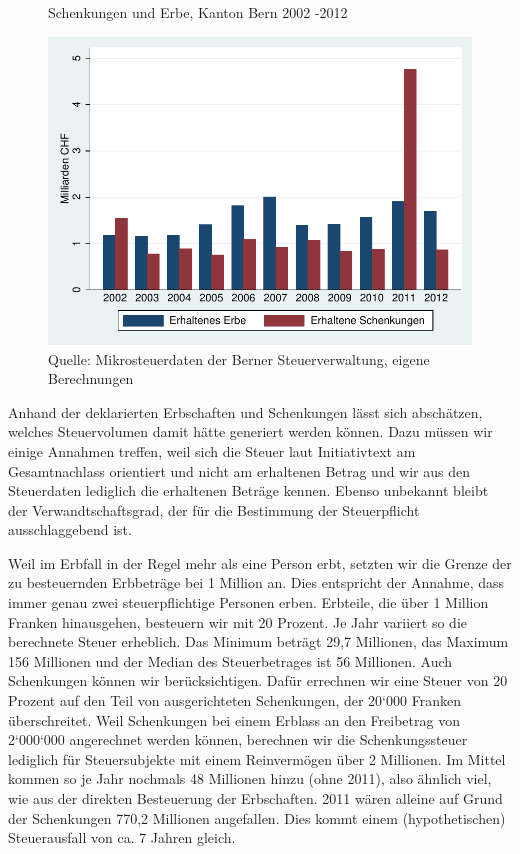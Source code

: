 \documentclass[a4paper, 12pt,liststotoc]{scrartcl}
\numberwithin{equation}{section}
\begin{document}
\begin{figure}[!ht]
  \caption{Schenkungen und Erbe, Kanton Bern 2002 -2012}
  \label{fig:schenkungen_und_erbe}
  \centering
    \includegraphics[width=\textwidth]{figure/ErbeSchenkungen}
  \caption*{Quelle: Mikrosteuerdaten der Berner Steuerverwaltung, eigene Berechnungen}
\end{figure}

Anhand der deklarierten Erbschaften und Schenkungen lässt sich
abschätzen, welches Steuervolumen damit hätte generiert werden können.
Dazu müssen wir einige Annahmen treffen, weil sich die Steuer laut
Initiativtext am Gesamtnachlass orientiert und nicht am erhaltenen
Betrag und wir aus den Steuerdaten lediglich die erhaltenen Beträge
kennen. Ebenso unbekannt bleibt der Verwandtschaftsgrad, der für die
Bestimmung der Steuerpflicht ausschlaggebend ist.

Weil im Erbfall in der Regel mehr als eine Person erbt, setzten wir die
Grenze der zu besteuernden Erbbeträge bei 1 Million an. Dies entspricht
der Annahme, dass immer genau zwei steuerpflichtige Personen erben.
Erbteile, die über 1 Million Franken hinausgehen, besteuern wir mit 20
Prozent. Je Jahr variiert so die berechnete Steuer erheblich. Das
Minimum beträgt 29,7 Millionen, das Maximum 156 Millionen und der Median
des Steuerbetrages ist 56 Millionen. Auch Schenkungen können wir
berücksichtigen. Dafür errechnen wir eine Steuer von 20 Prozent auf den
Teil von ausgerichteten Schenkungen, der 20`000 Franken überschreitet.
Weil Schenkungen bei einem Erblass an den Freibetrag von 2`000`000
angerechnet werden können, berechnen wir die Schenkungssteuer lediglich
für Steuersubjekte mit einem Reinvermögen über 2 Millionen. Im Mittel
kommen so je Jahr nochmals 48 Millionen hinzu (ohne 2011), also ähnlich
viel, wie aus der direkten Besteuerung der Erbschaften. 2011 wären
alleine auf Grund der Schenkungen 770,2 Millionen angefallen. Dies kommt
einem (hypothetischen) Steuerausfall von ca. 7 Jahren gleich.
\end{document}

